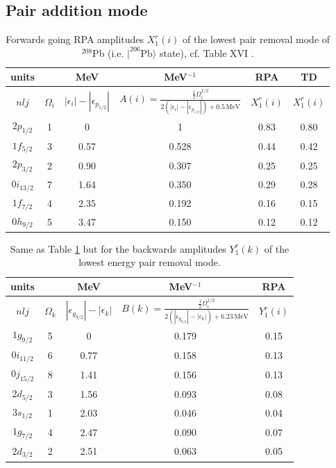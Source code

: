 \subsection{Pair addition mode}
\begin{table}
\begin{tabular}{|c|c|c|c|c|c|}
\hline units &  &MeV  &MeV$^{-1}$  & RPA & TD \\ 
\hline  $nlj$&$\Omega_i$  &$|\epsilon_i|-|\epsilon_{p_{1/2}}|$  &$A(i)=\frac{\frac{1}{2}\Omega_i^{1/2}}{2(|\epsilon_i|-|\epsilon_{p_{1/2}}|)+0.5\,\text{MeV}}$  & $X_1^r(i)$ & $X_1^r(i)$ \\ 
\hline  $2p_{1/2}$& 1 &  0& 1 &  0.83&  0.80\\ 
\hline $1f_{5/2}$ & 3 &  0.57&0.528  & 0.44 & 0.42 \\ 
\hline  $2p_{3/2}$& 2 &  0.90&  0.307&  0.25&  0.25\\ 
\hline  $0i_{13/2}$& 7 & 1.64 & 0.350 & 0.29 &  0.28\\ 
\hline  $1f_{7/2}$&  4& 2.35 &  0.192& 0.16 &  0.15\\ 
\hline  $0h_{9/2}$&  5& 3.47 & 0.150 &  0.12&0.12  \\ 
\hline 
\end{tabular}\caption{Forwards going RPA amplitudes $X_1^r(i)$ of the lowest pair removal mode of $^{208}$Pb (i.e. $|^{206}\text{Pb}\rangle$ state), cf. Table XVI \cite{Broglia:73}.}\label{tab1E2}
\end{table}
\begin{table}
\begin{tabular}{|c|c|c|c|c|}
\hline units &  &MeV  &MeV$^{-1}$  &  RPA  \\ 
\hline  $nlj$&$\Omega_k$  &$|\epsilon_{g_{9/2}}|-|\epsilon_k|$  &$B(k)=\frac{\frac{1}{2}\Omega_i^{1/2}}{2(|\epsilon_{g_{9/2}}|-|\epsilon_k|)+6.23\,\text{MeV}}$  & $Y_1^r(i)$  \\ 
\hline  $1g_{9/2}$& 5 &  0& 0.179 &  0.15\\ 
\hline $0i_{11/2}$ & 6 &  0.77&0.158  & 0.13  \\ 
\hline  $0j_{15/2}$& 8 &  1.41&  0.156&  0.13\\ 
\hline  $2d_{5/2}$& 3 & 1.56 & 0.093 & 0.08 \\ 
\hline  $3s_{1/2}$&  1& 2.03 &  0.046& 0.04\\ 
\hline  $1g_{7/2}$&  4& 2.47 & 0.090 &  0.07  \\ 
\hline  $2d_{3/2}$&  2& 2.51 & 0.063 &  0.05 \\ 
\hline 
\end{tabular}\caption{Same as Table \ref{tab1E2} but for the backwards amplitudes $Y_1^r(k)$ of the lowest energy pair removal mode.}\label{tab1E3}
\end{table}
